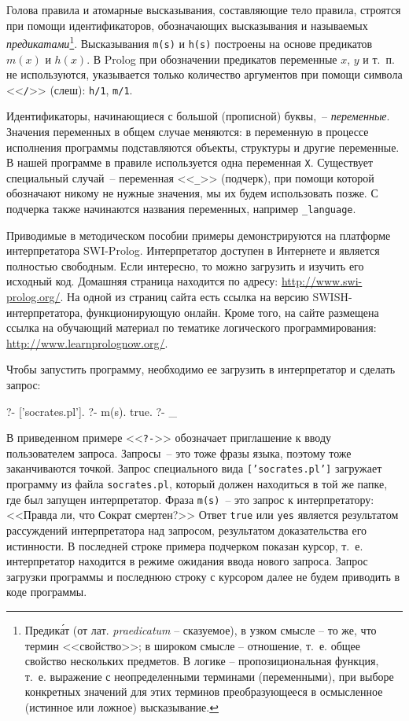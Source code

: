 \documentclass[a4paper,14pt, openany, twoside, final]{extbook} %
\begin{document}
Голова правила и атомарные высказывания, составляющие тело правила, строятся при помощи идентификаторов, обозначающих высказывания и называемых \emph{предикатами}\footnote{Предик\'{а}т (от лат. \emph{praedicatum} -- сказуемое), в узком смысле -- то же, что термин <<свойство>>; в широком смысле -- отношение, т.~е. общее свойство нескольких предметов. В логике -- пропозициональная функция, т.~е. выражение с неопределенными терминами (переменными), при выборе конкретных значений для этих терминов преобразующееся в осмысленное (истинное или ложное) высказывание.}.  Высказывания \texttt{m(s)} и \texttt{h(s)} построены на основе предикатов $m(x)$ и $h(x)$.  В Prolog при обозначении предикатов переменные $x$, $y$ и т.~п. не используются, указывается только количество аргументов при помощи символа <<\texttt{/}>> (слеш): \texttt{h/1}, \texttt{m/1}.

Идентификаторы, начинающиеся с большой (прописной) буквы,~-- \emph{переменные}.  Значения переменных в общем случае меняются: в переменную в процессе исполнения программы подставляются объекты, структуры и другие переменные.  В нашей программе в правиле используется одна переменная \texttt{X}.  Существует специальный случай~-- переменная <<\texttt{\_}>> (подчерк), при помощи которой обозначают никому не нужные значения, мы их будем использовать позже.  С подчерка также начинаются названия переменных, например \texttt{\_language}.

Приводимые в методическом пособии примеры демонстрируются на платформе интерпретатора SWI-Prolog.  Интерпретатор доступен в Интернете и является полностью свободным.  Если интересно, то можно загрузить и изучить его исходный код.  Домашняя страница находится по адресу: \url{http://www.swi-prolog.org/}.  На одной из страниц сайта есть ссылка на версию SWISH-интерпретатора, функционирующую онлайн.  Кроме того, на сайте размещена ссылка на обучающий материал по тематике логического программирования: \url{http://www.learnprolognow.org/}.

Чтобы запустить программу, необходимо ее загрузить в интерпретатор и сделать запрос:
\begin{proexp}
?- ['socrates.pl'].    %
?- m(s).               %
true.
?- _
\end{proexp}

  В приведенном примере <<\texttt{?-}>> обозначает приглашение к вводу пользователем запроса.  Запросы~-- это тоже фразы языка, поэтому тоже заканчиваются точкой.  Запрос специального вида \texttt{['socrates.pl']} загружает программу из файла \texttt{socrates.pl}, который должен находиться в той же папке, где был запущен интерпретатор.  Фраза \texttt{m(s)}~-- это запрос к интерпретатору: <<Правда ли, что Сократ смертен?>>  Ответ \texttt{true} или \texttt{yes} является результатом рассуждений интерпретатора над запросом, результатом доказательства его истинности.  В последней строке примера подчерком показан курсор, т.~е. интерпретатор находится в режиме ожидания ввода нового запроса.  Запрос загрузки программы и последнюю строку с курсором далее не будем приводить в коде программы.
\end{document}
